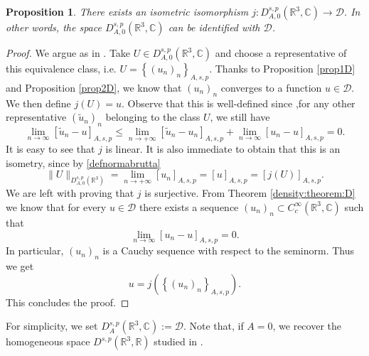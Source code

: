 \documentclass[leqno,11pt]{amsart}
\newcommand{\R}{\mathbb R}
\newcommand{\CC}{\mathbb C}
\newcommand{\C}{\mathbb C}
\newcommand{\cD}{{\mathcal D}}
\numberwithin{equation}{section}
\newtheorem{proposition}[theorem]{Proposition}
\begin{document}
\begin{proposition}
\label{isometric:isomorphism}
    There exists an isometric isomorphism $j:D^{s,p}_{A,0}(\R^3,\C) \to \cD$. In other words, the space $D^{s,p}_{A,0}(\R^3,\C)$ can be identified with $\cD$.
\end{proposition}
\begin{proof}
    We argue as in \cite[Theorem 3.1]{BrascoGV}.
    Take $U \in D^{s, p}_{A,0}(\R^3,\C)$ and choose a representative of this equivalence class, i.e. $U=\left\{(u_n)_n\right\}_{A,s, p}$. Thanks to Proposition \ref{prop1D} and Proposition \ref{prop2D}, we know that $(u_n)_n$ converges to a function $u \in \cD$. We then define
        $j(U)=u.$
    Observe that this is well-defined since ,for any other representative $(\widetilde{u}_n)_n$ belonging to the class $U$, we still have
    $$
        \lim _{n \rightarrow \infty}\left[\widetilde{u}_n-u\right]_{A,s,p} 
        \leq 
        \lim _{n \rightarrow +\infty}\left[\widetilde{u}_n-u_n\right]_{A,s,p}+\lim _{n \rightarrow \infty}\left[u_n-u\right]_{A,s,p}=0.
    $$
    It is easy to see that $j$ is linear. It is also immediate to obtain that this is an isometry, since by \eqref{defnormabrutta}
    $$
        \|U\|_{D^{s,p}_{A,0}(\R^3)}=\lim _{n \rightarrow +\infty}\left[u_n\right]_{A,s,p}=[u]_{A,s,p}=[j(U)]_{A,s,p}.
    $$
We are left with proving that $j$ is surjective. From Theorem \ref{density:theorem:D} we know that for every $u \in \cD$ there exists a sequence $(u_n)_n \subset C^{\infty}_c(\R^3,\C)$ such that
    $$
        \lim _{n \rightarrow \infty}\left[u_n-u\right]_{A,s,p}=0.
    $$
In particular, $(u_n)_n$ is a Cauchy sequence with respect to the seminorm. Thus we get
    $$
        u=j(\left\{(u_n)_n\right\}_{A,s, p}).
    $$
This concludes the proof.
\end{proof}





For simplicity, we set
$D^{s,p}_A(\R^3,\CC):=\cD$. Note that, if $A=0$, we recover the homogeneous space $D^{s,p}(\R^3,\R)$ studied in \cite{BrascoGV}.
\end{document}
